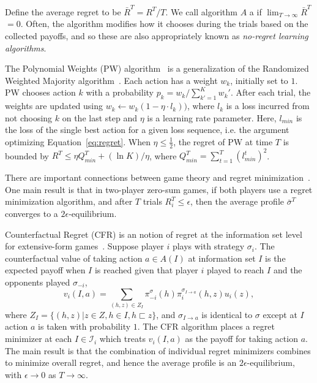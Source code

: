 \documentclass{aamas2014}
\newcommand{\cI}{\mathcal{I}}
\newcommand{\defword}[1]{\textbf{\boldmath{#1}}}
\begin{document}
Define the average regret to be $\bar{R}^T = R^T / T$. We call algorithm $A$ a 
\defword{regret minimization algorithm} if $\lim_{T \rightarrow \infty} \bar{R}^T$ $= 0$. 
Often, the algorithm modifies how it chooses during the trials based on the collected payoffs, and so 
these are also appropriately known as {\it no-regret learning algorithms}. 

The Polynomial Weights (PW) algorithm~\cite{CesaBianchi07Improved} is a generalization of the Randomized Weighted Majority 
algorithm~\cite{Littlestone94WM}. Each action has a weight $w_k$, initially set to $1$. PW chooses action $k$ with a probability
$p_k = w_k / \sum_{k'=1}^K w_k'$. After each trial, the weights are updated using $w_k \leftarrow w_k (1 - \eta \cdot l_k))$, 
where $l_k$ is a loss incurred from not choosing $k$ on the last step and $\eta$ is a learning rate parameter. 
Here, $l_{min}$ is the loss of the single best action for a given loss sequence, i.e. the argument optimizing 
Equation~\ref{eq:regret}. 
When $\eta \le \frac{1}{2}$, the regret of PW at time $T$ is bounded by $R^T \le \eta Q^T_{min} + (\ln K) / \eta$, where
$Q^T_{min} = \sum_{t=1}^T(l_{min}^t)^2$.

There are important connections between game theory and regret minimization~\cite{Blum07}. One main result 
is that in two-player zero-sum games, if both players use a regret minimization algorithm, and after 
$T$ trials $R_i^T \le \epsilon$, then the average profile $\bar{\sigma}^T$ converges to a $2\epsilon$-equilibrium.

Counterfactual Regret (CFR) is an notion of regret at the information set level for extensive-form games~\cite{CFR}. 
Suppose player $i$ plays with strategy $\sigma_i$. The counterfactual value of taking action $a \in A(I)$ at information 
set $I$ is the expected payoff when $I$ is reached given that player $i$ played to reach $I$ and the opponents played 
$\sigma_{-i}$, 
\begin{equation}
\label{eq:cfv}
v_i(I,a) = \sum_{(h,z) \in Z_I} \pi^{\sigma}_{-i}(h) \pi^{\sigma_{I \rightarrow a}}_{i}(h, z) u_i(z),
\end{equation}
where $Z_I = \{ (h,z) | z \in Z, h \in I, h \sqsubset z\}$, and $\sigma_{I \rightarrow a}$ is identical to $\sigma$ except 
at $I$ action $a$ is taken with probability $1$. 
The CFR algorithm places a regret minimizer at each $I \in \cI_i$ which treats $v_i(I,a)$ as the payoff for taking action $a$. 
The main result is that the combination of individual regret minimizers
combines to minimize overall regret, and hence the average profile is an $2\epsilon$-equilibrium, with $\epsilon \rightarrow 0$
as $T \rightarrow \infty$. 
\end{document}
